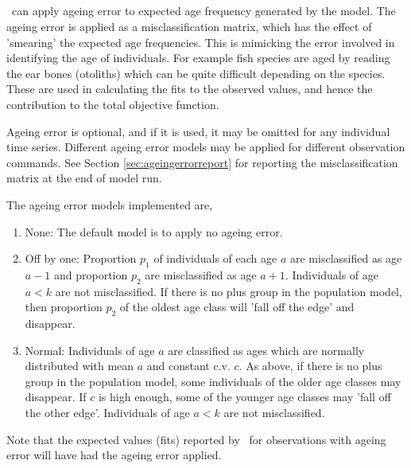 \subsection{}

\CNAME\ can apply ageing error to expected age frequency generated by the model. The ageing error is applied as a misclassification matrix, which has the effect of 'smearing' the expected age frequencies. This is mimicking the error involved in identifying the age of individuals. For example fish species are aged by reading the ear bones (otoliths) which can be quite difficult depending on the species. These are used in calculating the fits to the observed values, and hence the contribution to the total objective function. 

Ageing error is optional, and if it is used, it may be omitted for any individual time series. Different ageing error models may be applied for different observation commands. See Section \ref{sec:ageingerrorreport} for reporting the misclassification matrix at the end of model run.

The ageing error models implemented are,
\begin{enumerate}
  \item{None}: The default model is to apply no ageing error.
  \item{Off by one}: Proportion $p_1$ of individuals of each age $a$ are misclassified as age $a-1$ and proportion $p_2$ are misclassified as age $a+1$. Individuals of age $a < k$ are not misclassified. If there is no plus group in the population model, then proportion $p_2$ of the oldest age class will 'fall off the edge' and disappear. 
  \item{Normal}: Individuals of age $a$ are classified as ages which are normally distributed with mean $a$ and constant c.v. $c$. As above, if there is no plus group in the population model, some individuals of the older age classes may disappear. If $c$ is high enough, some of the younger age classes may 'fall off the other edge'. Individuals of age $a < k$ are not misclassified.
\end{enumerate}

Note that the expected values (fits) reported by \CNAME\ for observations with ageing error will have had the ageing error applied. 



\subsection{\label{sec:simulation-observations}}

